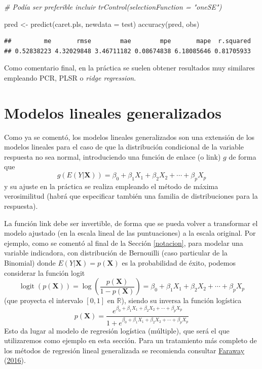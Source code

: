 \documentclass[
  spanish,
]{book}
\newenvironment{Shaded}{\begin{snugshade}}{\end{snugshade}}
\newcommand{\AttributeTok}[1]{\textcolor[rgb]{0.77,0.63,0.00}{#1}}
\newcommand{\CommentTok}[1]{\textcolor[rgb]{0.56,0.35,0.01}{\textit{#1}}}
\newcommand{\FunctionTok}[1]{\textcolor[rgb]{0.00,0.00,0.00}{#1}}
\newcommand{\NormalTok}[1]{#1}
\newcommand{\OtherTok}[1]{\textcolor[rgb]{0.56,0.35,0.01}{#1}}
\theoremstyle{break}
\theoremstyle{definition}
\theoremstyle{definition}
\theoremstyle{definition}
\theoremstyle{definition}
\theoremstyle{remark}
\begin{document}
\begin{Shaded}
\begin{Highlighting}[]
\CommentTok{\# Podía ser preferible incluir \textasciigrave{}trControl(selectionFunction = "oneSE")\textasciigrave{}}

\NormalTok{pred }\OtherTok{\textless{}{-}} \FunctionTok{predict}\NormalTok{(caret.pls, }\AttributeTok{newdata =}\NormalTok{ test)}
\FunctionTok{accuracy}\NormalTok{(pred, obs)}
\end{Highlighting}
\end{Shaded}

\begin{verbatim}
##         me       rmse        mae        mpe       mape  r.squared 
## 0.52838223 4.32029848 3.46711182 0.08674838 6.18085646 0.81705933
\end{verbatim}

Como comentario final, en la práctica se suelen obtener resultados muy similares empleando PCR, PLSR o \emph{ridge regression}.

\hypertarget{reg-glm}{%
\section{Modelos lineales generalizados}\label{reg-glm}}

Como ya se comentó, los modelos lineales generalizados son una extensión de los modelos lineales para el caso de que la distribución condicional de la variable respuesta no sea normal, introduciendo una función de enlace (o link) \(g\) de forma que
\[g\left(E(Y | \mathbf{X} )\right) = \beta_{0}+\beta_{1}X_{1}+\beta_{2}X_{2}+\cdots+\beta_{p}X_{p}\]
y su ajuste en la práctica se realiza empleando el método de máxima verosimilitud (habrá que especificar también una familia de distribuciones para la respuesta).

La función link debe ser invertible, de forma que se pueda volver a transformar el modelo ajustado (en la escala lineal de las puntuaciones) a la escala original.
Por ejemplo, como se comentó al final de la Sección \ref{notacion}, para modelar una variable indicadora, con distribución de Bernouilli (caso particular de la Binomial) donde \(E(Y | \mathbf{X} ) = p(\mathbf{X})\) es la probabilidad de éxito, podemos considerar la función logit
\[\operatorname{logit}(p(\mathbf{X}))=\log\left( \frac{p(\mathbf{X})}{1-p(\mathbf{X})} \right) = \beta_{0}+\beta_{1}X_{1}+\beta_{2}X_{2}+\cdots+\beta_{p}X_{p}\]
(que proyecta el intervalo \([0, 1]\) en \(\mathbb{R}\)), siendo su inversa la función logística
\[p(\mathbf{X}) = \frac{e^{\beta_{0}+\beta_{1}X_{1}+\beta_{2}X_{2}+\cdots+\beta_{p}X_{p}}}{1 + e^{\beta_{0}+\beta_{1}X_{1}+\beta_{2}X_{2}+\cdots+\beta_{p}X_{p}}}\]
Esto da lugar al modelo de regresión logística (múltiple), que será el que utilizaremos como ejemplo en esta sección.
Para un tratamiento más completo de los métodos de regresión lineal generalizada se recomienda consultar \protect\hyperlink{ref-faraway2014linear}{Faraway} (\protect\hyperlink{ref-faraway2014linear}{2016}).
\end{document}
